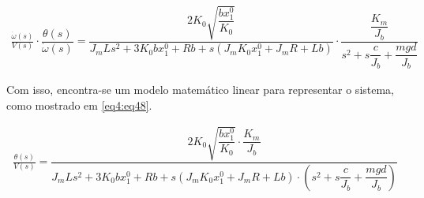 \begin{align}
    \frac{\dot{\omega}(s)}{V(s)} \cdot \dfrac{\theta(s)}{\dot{\omega}(s)}  = \dfrac{2 K_{0} \sqrt{\dfrac{b x^{0}_{1}}{K_{0}}}}{J_m L s^{2} + 3 K_{0} b x^{0}_{1} + R b + s \left(J_m K_{0} x^{0}_{1} + J_m R + L b\right)} \cdot \dfrac{\dfrac{K_m}{J_b}}{s^2 + s\dfrac{c}{J_b} +\dfrac{mgd}{J_b}} \label{eq4:eq47}
\end{align}

Com isso, encontra-se um modelo matemático linear para representar o sistema, como mostrado em \ref{eq4:eq48}.

\begin{align}
    \frac{\theta(s)}{V(s)}= \dfrac{2 K_{0} \sqrt{\dfrac{b x^{0}_{1}}{K_{0}}}\cdot \dfrac{K_m}{J_b}}{J_m L s^{2} + 3 K_{0} b x^{0}_{1} + R b + s \left(J_m K_{0} x^{0}_{1} + J_m R + L b\right)\cdot \left(s^2 + s\dfrac{c}{J_b} +\dfrac{mgd}{J_b}\right)} \label{eq4:eq48}
\end{align}

